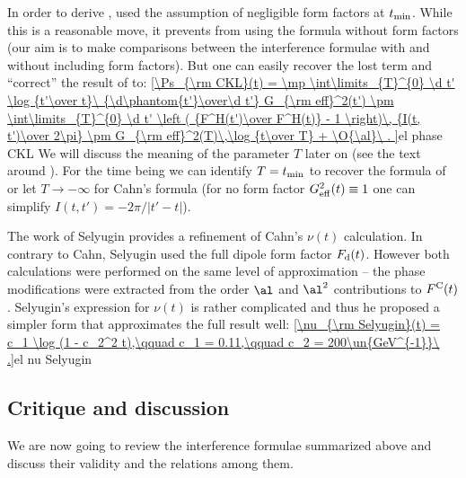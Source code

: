 In order to derive , \KaL{} used the assumption of negligible form factors at $t_{\rm min}$. While this is a reasonable move, it prevents from using the formula without form factors (our aim is to make comparisons between the interference formulae with and without including form factors). But one can easily recover the lost term and ``correct'' the result of \KL{} to:
\eqref{\Ps_{\rm CKL}(t) =
	\mp \int\limits_{T}^{0} \d t' \log {t'\over t}\ {\d\phantom{t'}\over\d t'} G_{\rm eff}^2(t')
	\pm \int\limits_{T}^{0} \d t' \left ( {F^H(t')\over F^H(t)} - 1 \right)\, {I(t, t')\over 2\pi}
	\pm G_{\rm eff}^2(T)\,\log {t\over T}
	+ \O{\al}\ .
}{el phase CKL}
We will discuss the meaning of the parameter $T$ later on (see the text around ). For the time being we can identify $T = t_{\rm min}$ to recover the formula of \KL{} or let $T\to -\infty$ for Cahn's formula (for no form factor $G_{\rm eff}^2(t) \equiv 1$ one can simplify $I(t, t') = -2\pi / |t' - t|$).

The work of Selyugin  provides a refinement of Cahn's $\nu(t)$ calculation. In contrary to Cahn, Selyugin used the full dipole form factor $F_{\rm d}(t)$. However both calculations were performed on the same level of approximation -- the phase modifications were extracted from the order $\al$ and $\al^2$ contributions to $F^{\rm C}(t)$. Selyugin's expression for $\nu(t)$ is rather complicated and thus he proposed a simpler form that approximates the full result well:
\eqref{\nu_{\rm Selyugin}(t) = c_1 \log (1 - c_2^2 t),\qquad c_1 = 0.11,\qquad c_2 = 200\un{GeV^{-1}}\ .}{el nu Selyugin}


\subsection[int cd]{Critique and discussion}

We are now going to review the interference formulae summarized above and discuss their validity and the relations among them.


